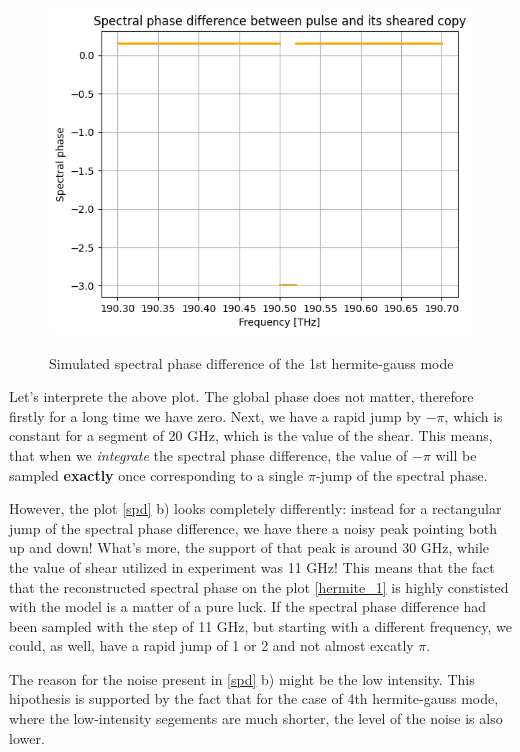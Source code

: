 \documentclass{article}
\begin{document}
\begin{figure}[H]
\caption{Simulated spectral phase difference of the 1st hermite-gauss mode}
\centering
\includegraphics[scale = 0.5]{expect}
\label{expect}
\end{figure}

Let's interprete the above plot. The global phase does not matter, therefore firstly for a long time we have zero. Next, we have a rapid jump by $-\pi$, which is constant for a segment of 20 GHz, which is the value of the shear. This means, that when we \emph{integrate} the spectral phase difference, the value of $-\pi$ will be sampled \textbf{exactly} once corresponding to a single $\pi$-jump of the spectral phase.

However, the plot \ref{spd} b) looks completely differently: instead for a rectangular jump of the spectral phase difference, we have there a noisy peak pointing both up and down! What's more, the support of that peak is around 30 GHz, while the value of shear utilized in experiment was 11 GHz! This means that the fact that the reconstructed spectral phase on the plot \ref{hermite_1} is highly constisted with the model is a matter of a pure luck. If the spectral phase difference had been sampled with the step of 11 GHz, but starting with a different frequency, we could, as well, have a rapid jump of 1 or 2 and not almost excatly $\pi$.

The reason for the noise present in \ref{spd} b) might be the low intensity. This hipothesis is supported by the fact that for the case of 4th hermite-gauss mode, where the low-intensity segements are much shorter, the level of the noise is also lower.
\end{document}
